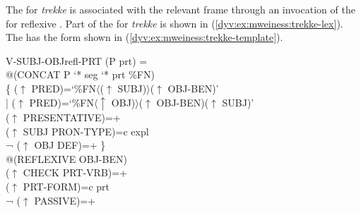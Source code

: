 \documentclass[output=paper]{langsci/langscibook}
\begin{document}
The  for \textit{trekke} is associated with the relevant frame through an invocation of the  for reflexive .
Part of the  for \textit{trekke} is shown in  (\ref{dyv:ex:mweiness:trekke-lex}).
The  has the form shown in  (\ref{dyv:ex:mweiness:trekke-template}).


\ea\label{dyv:ex:mweiness:trekke-template}
{\small 
V-SUBJ-OBJrefl-PRT (P prt) =\\%
\hspace{1.5em} @(CONCAT P `* seg `* prt  \%FN)\\%
\hspace{1.5em}  \{ \enspace ($\uparrow$  PRED)=`\%FN$\langle$($\uparrow$ SUBJ)$\rangle$($\uparrow$ OBJ-BEN)'\\%
\hspace{1.5em} | \enspace ($\uparrow$  PRED)=`\%FN$\langle\uparrow$ OBJ)$\rangle$($\uparrow$  OBJ-BEN)($\uparrow$ SUBJ)'\\%
\hspace{1.5em} \quad ($\uparrow$ PRESENTATIVE)=+\\%
\hspace{1.5em} \quad ($\uparrow$ SUBJ PRON-TYPE)=c expl\\%
\hspace{1.5em} \quad ¬ ($\uparrow$ OBJ DEF)=+ \enspace \}\\%
\hspace{1.5em} @(REFLEXIVE OBJ-BEN)\\%
\hspace{1.5em} ($\uparrow$ CHECK PRT-VRB)=+\\%
\hspace{1.5em} ($\uparrow$ PRT-FORM)=c prt\\%
\hspace{1.5em} ¬ ($\uparrow$ PASSIVE)=+
}
\z
\end{document}

